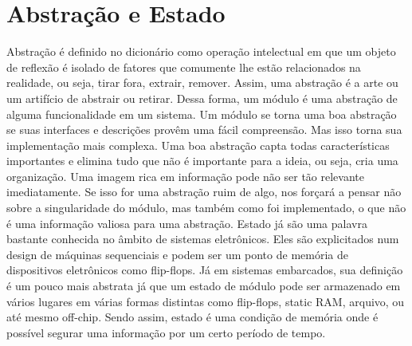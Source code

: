 \section{Abstração e Estado}
Abstração é definido no dicionário como operação intelectual em que um objeto de reflexão é isolado de fatores que comumente lhe estão relacionados na realidade, ou seja, tirar fora, extrair, remover. Assim, uma abstração é a arte ou um artifício de abstrair ou retirar. Dessa forma, um módulo é uma abstração de alguma funcionalidade em um sistema. Um módulo se torna uma boa abstração se suas interfaces e descrições provêm uma fácil compreensão. Mas isso torna sua implementação mais complexa. Uma boa abstração capta todas características importantes e elimina tudo que não é importante para a ideia, ou seja, cria uma organização. Uma imagem rica em informação pode não ser tão relevante imediatamente. Se isso for uma abstração ruim de algo, nos forçará a pensar não sobre a singularidade do módulo, mas também como foi implementado, o que não é uma informação valiosa para uma abstração.
Estado já são uma palavra bastante conhecida no âmbito de sistemas eletrônicos. Eles são explicitados num design de máquinas sequenciais e podem ser um ponto de memória de dispositivos eletrônicos como flip-flops. Já em sistemas embarcados, sua definição é um pouco mais abstrata já que um estado de módulo pode ser armazenado em vários lugares em várias formas distintas como flip-flops, static RAM, arquivo, ou até mesmo off-chip. Sendo assim, estado é uma condição de memória onde é possível segurar uma informação por um certo período de tempo.


